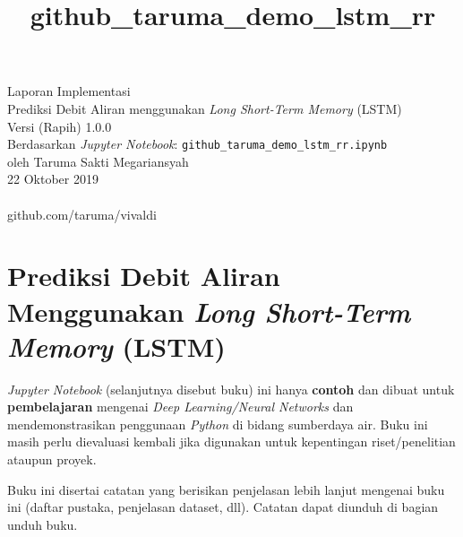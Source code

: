 \documentclass[11pt]{article}
\title{github\_taruma\_demo\_lstm\_rr}
\let\oldsection\section
\renewcommand\section{\clearpage\oldsection}
\begin{document}
   
	\begin{titlepage}
		\vspace*{\fill}
		\begin{center}
 		\normalsize Laporan Implementasi \\
		\huge Prediksi Debit Aliran menggunakan \emph{Long Short-Term Memory} (LSTM)\\ 
		\normalsize Versi (Rapih) 1.0.0 \\[0.2cm]
      	\small Berdasarkan \emph{Jupyter Notebook}: \texttt{github\_taruma\_demo\_lstm\_rr.ipynb} \\[0.5cm]
		\normalsize oleh Taruma Sakti Megariansyah\\[0.5cm]
      	\normalsize 22 Oktober 2019\\[1cm]
    	\\
      	\normalsize github.com/taruma/vivaldi
		\end{center}
    	\vspace*{\fill}
	\end{titlepage}
    

    
    \hypertarget{prediksi-debit-aliran-menggunakan-long-short-term-memory-lstm}{%
\section{\texorpdfstring{Prediksi Debit Aliran Menggunakan \emph{Long
Short-Term Memory}
(LSTM)}{Prediksi Debit Aliran Menggunakan Long Short-Term Memory (LSTM)}}\label{prediksi-debit-aliran-menggunakan-long-short-term-memory-lstm}}

\emph{Jupyter Notebook} (selanjutnya disebut buku) ini hanya
\textbf{contoh} dan dibuat untuk \textbf{pembelajaran} mengenai
\emph{Deep Learning/Neural Networks} dan mendemonstrasikan penggunaan
\emph{Python} di bidang sumberdaya air. Buku ini masih perlu dievaluasi
kembali jika digunakan untuk kepentingan riset/penelitian ataupun
proyek.

Buku ini disertai catatan yang berisikan penjelasan lebih lanjut
mengenai buku ini (daftar pustaka, penjelasan dataset, dll). Catatan
dapat diunduh di bagian unduh buku.
\end{document}
